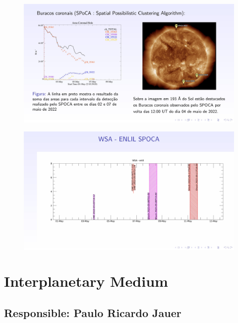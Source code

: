 \documentclass[a4paper, 10pt]{article}
\begin{document}
    \begin{figure}[H]
        \centering
        \includegraphics[width=14cm]{./figures/en_outfileSun_0.jpg}
    \end{figure} 
 

    
    \begin{figure}[H]
        \centering
        \includegraphics[width=14cm]{./figures/en_outfileSun_1.jpg}
    \end{figure} 
 

    \section{Interplanetary Medium} 
 \subsection{Responsible: Paulo Ricardo Jauer} 
 
\end{document}
